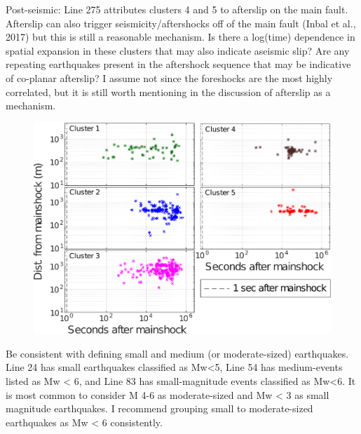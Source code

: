 \documentclass[10pt]{extarticle}
\begin{document}
\begin{Answer}
 \WorkInProgressRevTask
\end{Answer}
%
%



\begin{ReviewerComment}{2}
\noindent 
Post-seismic: Line 275 attributes clusters 4 and 5 to afterslip on the main fault. Afterslip can also trigger seismicity/aftershocks off of the main fault (Inbal et al., 2017) but this is still a reasonable mechanism. Is there a log(time) dependence in spatial expansion in these clusters that may also indicate aseismic slip? Are any repeating earthquakes present in the aftershock sequence that may be indicative of co-planar afterslip? I assume not since the foreshocks are the most highly correlated, but it is still worth mentioning in the discussion of afterslip as a mechanism.
\end{ReviewerComment}


\begin{Answer}
\begin{figure}[!h]
\begin{center}
 \includegraphics[width=0.7\linewidth]{S3_loglog_time.png} 
\end{center}
\end{figure}
 \WorkInProgressRevTask
\end{Answer}
%
%




\begin{ReviewerComment}{2}
\noindent 
Be consistent with defining small and medium (or moderate-sized) earthquakes. Line 24 has small earthquakes classified as  Mw<5, Line 54 has medium-events listed as Mw < 6, and Line 83 has small-magnitude events classified as Mw<6. It is most common to consider M 4-6 as moderate-sized and Mw < 3 as small magnitude earthquakes. I recommend grouping small to moderate-sized earthquakes as Mw < 6 consistently.

\end{ReviewerComment}
\end{document}
